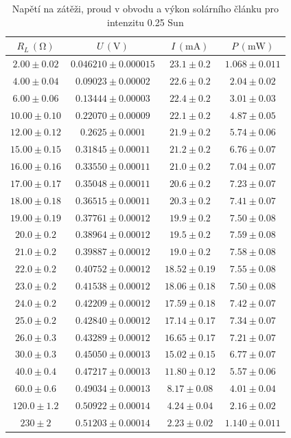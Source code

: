 \documentclass{../concepts/prepareprotokol} %
\begin{document}
\begin{table}[hbtp]
\centering
\caption{Napětí na zátěži, proud v obvodu a výkon solárního článku pro intenzitu 0.25 Sun}
\begin{tabular}{cccc}
 \toprule
 $R_L\, (\mathrm{\Omega})$ & $U\, (\mathrm{V})$ & $I\, (\mathrm{mA})$ & $P\, (\mathrm{mW})$ \\  
 \midrule
 $2.00 \pm 0.02$ & $0.046210 \pm 0.000015$ & $23.1 \pm 0.2$ & $1.068 \pm 0.011$ \\
 $4.00 \pm 0.04$ & $0.09023 \pm 0.00002$ & $22.6 \pm 0.2$ & $2.04 \pm 0.02$ \\
 $6.00 \pm 0.06$ & $0.13444 \pm 0.00003$ & $22.4 \pm 0.2$ & $3.01 \pm 0.03$ \\
 $10.00 \pm 0.10$ & $0.22070 \pm 0.00009$ & $22.1 \pm 0.2$ & $4.87 \pm 0.05$ \\
 $12.00 \pm 0.12$ & $0.2625 \pm 0.0001$ & $21.9 \pm 0.2$ & $5.74 \pm 0.06$ \\
 $15.00 \pm 0.15$ & $0.31845 \pm 0.00011$ & $21.2 \pm 0.2$ & $6.76 \pm 0.07$ \\
 $16.00 \pm 0.16$ & $0.33550 \pm 0.00011$ & $21.0 \pm 0.2$ & $7.04 \pm 0.07$ \\
 $17.00 \pm 0.17$ & $0.35048 \pm 0.00011$ & $20.6 \pm 0.2$ & $7.23 \pm 0.07$ \\
 $18.00 \pm 0.18$ & $0.36515 \pm 0.00011$ & $20.3 \pm 0.2$ & $7.41 \pm 0.07$ \\
 $19.00 \pm 0.19$ & $0.37761 \pm 0.00012$ & $19.9 \pm 0.2$ & $7.50 \pm 0.08$ \\
 $20.0 \pm 0.2$ & $0.38964 \pm 0.00012$ & $19.5 \pm 0.2$ & $7.59 \pm 0.08$ \\
 $21.0 \pm 0.2$ & $0.39887 \pm 0.00012$ & $19.0 \pm 0.2$ & $7.58 \pm 0.08$ \\
 $22.0 \pm 0.2$ & $0.40752 \pm 0.00012$ & $18.52 \pm 0.19$ & $7.55 \pm 0.08$ \\
 $23.0 \pm 0.2$ & $0.41538 \pm 0.00012$ & $18.06 \pm 0.18$ & $7.50 \pm 0.08$ \\
 $24.0 \pm 0.2$ & $0.42209 \pm 0.00012$ & $17.59 \pm 0.18$ & $7.42 \pm 0.07$ \\
 $25.0 \pm 0.2$ & $0.42840 \pm 0.00012$ & $17.14 \pm 0.17$ & $7.34 \pm 0.07$ \\
 $26.0 \pm 0.3$ & $0.43289 \pm 0.00012$ & $16.65 \pm 0.17$ & $7.21 \pm 0.07$ \\
 $30.0 \pm 0.3$ & $0.45050 \pm 0.00013$ & $15.02 \pm 0.15$ & $6.77 \pm 0.07$ \\
 $40.0 \pm 0.4$ & $0.47217 \pm 0.00013$ & $11.80 \pm 0.12$ & $5.57 \pm 0.06$ \\
 $60.0 \pm 0.6$ & $0.49034 \pm 0.00013$ & $8.17 \pm 0.08$ & $4.01 \pm 0.04$ \\
 $120.0 \pm 1.2$ & $0.50922 \pm 0.00014$ & $4.24 \pm 0.04$ & $2.16 \pm 0.02$ \\
 $230 \pm 2$ & $0.51203 \pm 0.00014$ & $2.23 \pm 0.02$ & $1.140 \pm 0.011$ \\
 \bottomrule
\end{tabular}
\label{tab:25}
\end{table}
\end{document}
